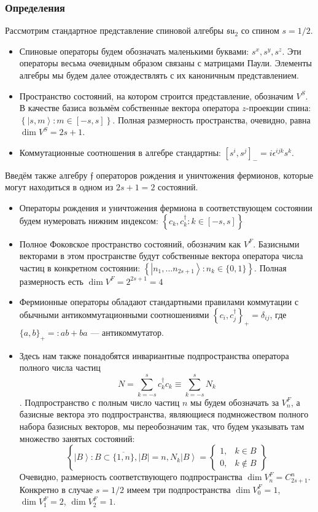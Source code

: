 \subsubsection{Определения}
Рассмотрим стандартное представление спиновой алгебры $\mathfrak{su}_2$ со спином $s = 1/2$.
\begin{itemize}
	\item Спиновые операторы будем обозначать маленькими буквами: $s^x, s^y, s^z$. Эти операторы весьма очевидным образом связаны с матрицами Паули. Элементы алгебры мы будем далее отождествлять с их каноничным представлением.
	\item Пространство состояний, на котором строится представление, обозначим $V^S$. В качестве базиса возьмём собственные вектора оператора $z$-проекции спина: $\left\{ \left|s, m\right>: m\in[-s,s] \right\}$. Полная размерность пространства, очевидно, равна $\dim V^S = 2s+1$.
	\item Коммутационные соотношения в алгебре стандартны: $ \left[ s^i, s^j \right]_{-} = i \epsilon^{ijk} s^k $.
\end{itemize}
Введём также алгебру $\mathfrak{f}$ операторов рождения и уничтожения фермионов, которые могут находиться в одном из $2s+1 = 2$ состояний.
\begin{itemize}
	\item Операторы рождения и уничтожения фермиона в соответствующем состоянии будем нумеровать нижним индексом:	$\left\{ c_k, c_k^\dagger: k\in[-s,s] \right\} $
	\item Полное Фоковское пространство состояний, обозначим как $V^F$. Базисными векторами в этом пространстве будут собственные вектора оператора числа частиц в конкретном состоянии: $\left\{ \left| n_1,...n_{2s+1} \right>: n_k \in \{0, 1\} \right\}$. Полная размерность есть $\dim V^F = 2^{2s+1} = 4$
	\item Фермионные операторы обладают стандартными правилами коммутации с обычными антикоммутационными соотношениями	$\left\{ c_i, c^\dagger_j \right\}_{+} = \delta_{ij} $, 
	где $\{a,b\}_{+} =: ab + ba$ --- антикоммутатор.
	\item Здесь нам также понадобятся инвариантные подпространства оператора полного числа частиц
	$$N = \sum_{k = -s}^{s} c^\dagger_k c_k \equiv \sum_{k = -s}^{s} N_k$$.
	Подпространство с полным число частиц $n$ мы будем обозначать за $V^F_n$, а базисные вектора это подпространства, являющиеся подмножеством полного набора базисных векторов, мы переобозначим так, что будем указывать там множество занятых состояний: 
	$$\left\{ \left| B \right>: B \subset \overline{\{1,n\}}, |B| = n, N_k \left| B \right> = \begin{cases}
	1, & k\in B\\
	0, & k\notin B
	\end{cases}  \right\}$$
	Очевидно, размерность соответствующего подпространства $\dim V^F_n = C_{2s+1}^n$. Конкретно в случае $s = 1/2$ имеем три подпространства $\dim V^F_0 = 1$, $\dim V^F_1 = 2$,  $\dim V^F_2 = 1$.
\end{itemize} 

